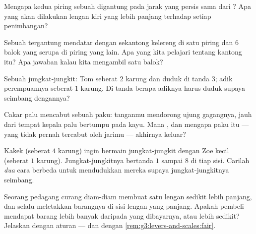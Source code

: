 \begin{exercise}[$\star$]\label{exo:g3:levers-and-scales:6}
Mengapa kedua piring sebuah  digantung pada jarak yang persis
sama dari ? Apa yang akan dilakukan lengan kiri yang lebih
panjang terhadap setiap penimbangan?
\end{exercise}

\begin{exercise}[$\star$]\label{exo:g3:levers-and-scales:7}
Sebuah  tergantung mendatar dengan sekantong kelereng di satu
piring dan $6$ balok yang serupa di piring yang lain. Apa yang kita
pelajari tentang kantong itu? Apa jawaban  kalau kita mengambil
satu balok?
\end{exercise}

\begin{exercise}[$\star$]\label{exo:g3:levers-and-scales:8}
Sebuah jungkat-jungkit: Tom seberat $2$ karung dan duduk di tanda $3$;
adik perempuannya seberat $1$ karung. Di tanda berapa adiknya harus
duduk supaya seimbang dengannya?
\end{exercise}

\begin{exercise}[$\star$]\label{exo:g3:levers-and-scales:9}
Cakar palu mencabut sebuah paku: tanganmu mendorong ujung gagangnya,
jauh dari tempat kepala palu bertumpu pada kayu. Mana ,
dan mengapa paku itu --- yang tidak pernah tercabut oleh jarimu ---
akhirnya keluar?
\end{exercise}

\begin{exercise}[$\star\star$]\label{exo:g3:levers-and-scales:10}
Kakek (seberat $4$ karung) ingin bermain jungkat-jungkit dengan Zoe
kecil (seberat $1$ karung). Jungkat-jungkitnya bertanda $1$ sampai $8$
di tiap sisi. Carilah \emph{dua} cara berbeda untuk mendudukkan mereka
supaya jungkat-jungkitnya seimbang.
\end{exercise}

\begin{exercise}[$\star\star$]\label{exo:g3:levers-and-scales:11}
Seorang pedagang curang diam-diam membuat satu lengan 
sedikit lebih panjang, dan selalu meletakkan barangnya di sisi lengan
yang panjang. Apakah pembeli mendapat barang lebih banyak daripada
yang dibayarnya, atau lebih sedikit? Jelaskan dengan aturan  ---
dan dengan \cref{rem:g3:levers-and-scales:fair}.
\end{exercise}
